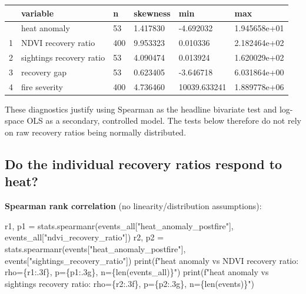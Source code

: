 \documentclass[
  letterpaper,
  DIV=11,
  numbers=noendperiod]{scrartcl}
\newenvironment{Shaded}{\begin{snugshade}}{\end{snugshade}}
\newcommand{\BuiltInTok}[1]{\textcolor[rgb]{0.00,0.23,0.31}{#1}}
\newcommand{\NormalTok}[1]{\textcolor[rgb]{0.00,0.23,0.31}{#1}}
\newcommand{\OperatorTok}[1]{\textcolor[rgb]{0.37,0.37,0.37}{#1}}
\newcommand{\SpecialCharTok}[1]{\textcolor[rgb]{0.37,0.37,0.37}{#1}}
\newcommand{\SpecialStringTok}[1]{\textcolor[rgb]{0.13,0.47,0.30}{#1}}
\newcommand{\StringTok}[1]{\textcolor[rgb]{0.13,0.47,0.30}{#1}}
\begin{document}
\begin{longtable}[]{@{}llllll@{}}
\toprule\noalign{}
& variable & n & skewness & min & max \\
\midrule\noalign{}
\endhead
\bottomrule\noalign{}
\endlastfoot
0 & heat anomaly & 53 & 1.417830 & -4.692032 & 1.945658e+01 \\
1 & NDVI recovery ratio & 400 & 9.953323 & 0.010336 & 2.182464e+02 \\
2 & sightings recovery ratio & 53 & 4.090474 & 0.013924 &
1.620029e+02 \\
3 & recovery gap & 53 & 0.623405 & -3.646718 & 6.031864e+00 \\
4 & fire severity & 400 & 4.736460 & 10039.633241 & 1.889778e+06 \\
\end{longtable}

These diagnostics justify using Spearman as the headline bivariate test
and log-space OLS as a secondary, controlled model. The tests below
therefore do not rely on raw recovery ratios being normally distributed.

\subsection{Do the individual recovery ratios respond to
heat?}\label{do-the-individual-recovery-ratios-respond-to-heat}

\textbf{Spearman rank correlation} (no linearity/distribution
assumptions):

\begin{Shaded}
\begin{Highlighting}[]
\NormalTok{r1, p1 }\OperatorTok{=}\NormalTok{ stats.spearmanr(events\_all[}\StringTok{"heat\_anomaly\_postfire"}\NormalTok{], events\_all[}\StringTok{"ndvi\_recovery\_ratio"}\NormalTok{])}
\NormalTok{r2, p2 }\OperatorTok{=}\NormalTok{ stats.spearmanr(events[}\StringTok{"heat\_anomaly\_postfire"}\NormalTok{], events[}\StringTok{"sightings\_recovery\_ratio"}\NormalTok{])}
\BuiltInTok{print}\NormalTok{(}\SpecialStringTok{f"heat anomaly vs NDVI recovery ratio:       rho=}\SpecialCharTok{\{}\NormalTok{r1}\SpecialCharTok{:.3f\}}\SpecialStringTok{, p=}\SpecialCharTok{\{}\NormalTok{p1}\SpecialCharTok{:.3g\}}\SpecialStringTok{, n=}\SpecialCharTok{\{}\BuiltInTok{len}\NormalTok{(events\_all)}\SpecialCharTok{\}}\SpecialStringTok{"}\NormalTok{)}
\BuiltInTok{print}\NormalTok{(}\SpecialStringTok{f"heat anomaly vs sightings recovery ratio:  rho=}\SpecialCharTok{\{}\NormalTok{r2}\SpecialCharTok{:.3f\}}\SpecialStringTok{, p=}\SpecialCharTok{\{}\NormalTok{p2}\SpecialCharTok{:.3g\}}\SpecialStringTok{, n=}\SpecialCharTok{\{}\BuiltInTok{len}\NormalTok{(events)}\SpecialCharTok{\}}\SpecialStringTok{"}\NormalTok{)}
\end{Highlighting}
\end{Shaded}
\end{document}
